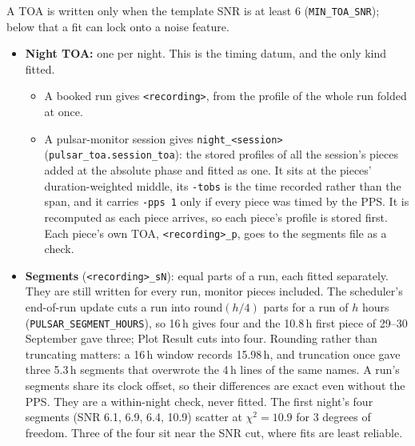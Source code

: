 \documentclass[11pt,a4paper]{article}
\newcommand{\code}[1]{\texttt{#1}}
\begin{document}
A TOA is written only when the template SNR is at least 6 (\code{MIN\_TOA\_SNR}); below that a fit can lock onto a noise feature.
\begin{itemize}
\item \textbf{Night TOA:} one per night. This is the timing datum, and the only kind fitted.
  \begin{itemize}
  \item A booked run gives \code{<recording>}, from the profile of the whole run folded at once.
  \item A pulsar-monitor session gives \code{night\_<session>} (\code{pulsar\_toa.session\_toa}): the stored profiles of all the session's pieces added at the absolute phase and fitted as one. It sits at the pieces' duration-weighted middle, its \code{-tobs} is the time recorded rather than the span, and it carries \code{-pps 1} only if every piece was timed by the PPS. It is recomputed as each piece arrives, so each piece's profile is stored first. Each piece's own TOA, \code{<recording>\_p}, goes to the segments file as a check.
  \end{itemize}
\item \textbf{Segments} (\code{<recording>\_sN}): equal parts of a run, each fitted separately. They are still written for every run, monitor pieces included. The scheduler's end-of-run update cuts a run into $\mathrm{round}(h/4)$ parts for a run of $h$ hours (\code{PULSAR\_SEGMENT\_HOURS}), so 16\,h gives four and the 10.8\,h first piece of 29--30 September gave three; Plot Result cuts into four. Rounding rather than truncating matters: a 16\,h window records 15.98\,h, and truncation once gave three 5.3\,h segments that overwrote the 4\,h lines of the same names. A run's segments share its clock offset, so their differences are exact even without the PPS. They are a within-night check, never fitted. The first night's four segments (SNR 6.1, 6.9, 6.4, 10.9) scatter at $\chi^2 = 10.9$ for 3 degrees of freedom. Three of the four sit near the SNR cut, where fits are least reliable.
\end{itemize}
\end{document}
